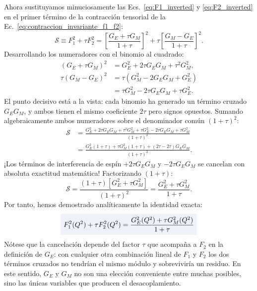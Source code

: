 \documentclass[10pt,a4paper]{article}
\newcommand{\dest}[1]{{\setlength{\fboxsep}{4pt}\colorbox{colordest}{$\displaystyle #1$}}}
\begin{document}
Ahora sustituyamos minuciosamente las Ecs.~\eqref{eq:F1_inverted} y \eqref{eq:F2_inverted} en el primer término de la contracción tensorial de la Ec.~\eqref{eq:contraccion_invariante_f1_f2}:
\begin{equation}
\mathcal{S} \equiv F_1^2 + \tau F_2^2 = \left[ \frac{G_E + \tau G_M}{1 + \tau} \right]^2 + \tau \left[ \frac{G_M - G_E}{1 + \tau} \right]^2.
\end{equation}
Desarrollando los numeradores con el binomio al cuadrado:
\begin{align}
(G_E + \tau G_M)^2 &= G_E^2 + 2\tau G_E G_M + \tau^2 G_M^2, \\
\tau (G_M - G_E)^2 &= \tau (G_M^2 - 2 G_E G_M + G_E^2) \nonumber \\
&= \tau G_M^2 - 2\tau G_E G_M + \tau G_E^2.
\end{align}
El punto decisivo está a la vista: cada binomio ha generado un término cruzado $G_EG_M$, y ambos tienen el mismo coeficiente $2\tau$ pero signos opuestos. Sumando algebraicamente ambos numeradores sobre el denominador común $(1+\tau)^2$:
\begin{align}
\mathcal{S} &= \frac{G_E^2 + 2\tau G_E G_M + \tau^2 G_M^2 + \tau G_E^2 - 2\tau G_E G_M + \tau G_M^2}{(1+\tau)^2} \nonumber \\
&= \frac{G_E^2(1 + \tau) + \tau G_M^2(1 + \tau) + (2\tau - 2\tau) G_E G_M}{(1+\tau)^2}.
\end{align}
¡Los términos de interferencia de espín $+2\tau G_E G_M$ y $-2\tau G_E G_M$ se cancelan con absoluta exactitud matemática! Factorizando $(1+\tau)$:
\begin{equation}
\mathcal{S} = \frac{(1+\tau) \left[ G_E^2 + \tau G_M^2 \right]}{(1+\tau)^2} = \frac{G_E^2 + \tau G_M^2}{1 + \tau}.
\end{equation}
Por tanto, hemos demostrado analíticamente la identidad exacta:
\begin{equation}
\dest{F_1^2(Q^2) + \tau F_2^2(Q^2) = \frac{G_E^2(Q^2) + \tau G_M^2(Q^2)}{1 + \tau}}
\label{eq:sachs_identity_proved}
\end{equation}
Nótese que la cancelación depende del factor $\tau$ que acompaña a $F_2$ en la definición de $G_E$: con cualquier otra combinación lineal de $F_1$ y $F_2$ los dos términos cruzados no tendrían el mismo módulo y sobreviviría un residuo. En este sentido, $G_E$ y $G_M$ no son una elección conveniente entre muchas posibles, sino las únicas variables que producen el desacoplamiento.
\end{document}
